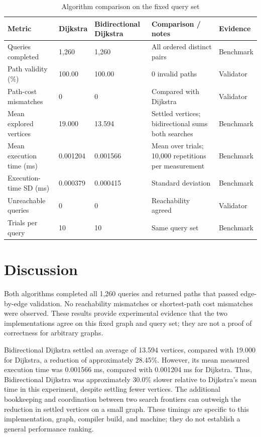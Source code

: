 \documentclass[conference]{IEEEtran}
\begin{document}
\begin{table}[t]
\caption{Algorithm comparison on the fixed query set}
\label{tab:results}
\centering
\begin{tabularx}{\textwidth}{lXXXX}
\toprule
Metric & Dijkstra & Bidirectional Dijkstra & Comparison / notes & Evidence\\
\midrule
Queries completed & 1,260 & 1,260 & All ordered distinct pairs & Benchmark\\
Path validity (\%) & 100.00 & 100.00 & 0 invalid paths & Validator\\
Path-cost mismatches & 0 & 0 & Compared with Dijkstra & Validator\\
Mean explored vertices & 19.000 & 13.594 & Settled vertices; bidirectional sums both searches & Benchmark\\
Mean execution time (ms) & 0.001204 & 0.001566 & Mean over trials; 10,000 repetitions per measurement & Benchmark\\
Execution-time SD (ms) & 0.000379 & 0.000415 & Standard deviation & Benchmark\\
Unreachable queries & 0 & 0 & Reachability agreed & Validator\\
Trials per query & 10 & 10 & Same query set & Benchmark\\
\bottomrule
\end{tabularx}
\end{table}

\section{Discussion}
Both algorithms completed all 1,260 queries and returned paths that passed edge-by-edge validation. No reachability mismatches or shortest-path cost mismatches were observed. These results provide experimental evidence that the two implementations agree on this fixed graph and query set; they are not a proof of correctness for arbitrary graphs.

Bidirectional Dijkstra settled an average of 13.594 vertices, compared with 19.000 for Dijkstra, a reduction of approximately 28.45\%. However, its mean measured execution time was 0.001566 ms, compared with 0.001204 ms for Dijkstra. Thus, Bidirectional Dijkstra was approximately 30.0\% slower relative to Dijkstra's mean time in this experiment, despite settling fewer vertices. The additional bookkeeping and coordination between two search frontiers can outweigh the reduction in settled vertices on a small graph. These timings are specific to this implementation, graph, compiler build, and machine; they do not establish a general performance ranking.
\end{document}
